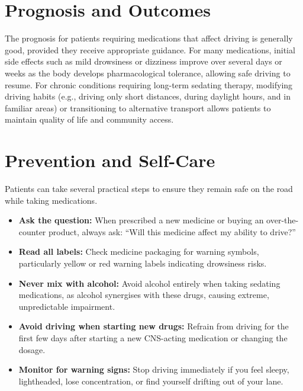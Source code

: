 \section*{Prognosis and Outcomes}
The prognosis for patients requiring medications that affect driving is generally good, provided they receive appropriate guidance. For many medications, initial side effects such as mild drowsiness or dizziness improve over several days or weeks as the body develops pharmacological tolerance, allowing safe driving to resume. For chronic conditions requiring long-term sedating therapy, modifying driving habits (e.g., driving only short distances, during daylight hours, and in familiar areas) or transitioning to alternative transport allows patients to maintain quality of life and community access.

\section*{Prevention and Self-Care}
Patients can take several practical steps to ensure they remain safe on the road while taking medications.
\begin{itemize}
    \item \textbf{Ask the question:} When prescribed a new medicine or buying an over-the-counter product, always ask: ``Will this medicine affect my ability to drive?''
    \item \textbf{Read all labels:} Check medicine packaging for warning symbols, particularly yellow or red warning labels indicating drowsiness risks.
    \item \textbf{Never mix with alcohol:} Avoid alcohol entirely when taking sedating medications, as alcohol synergises with these drugs, causing extreme, unpredictable impairment.
    \item \textbf{Avoid driving when starting new drugs:} Refrain from driving for the first few days after starting a new CNS-acting medication or changing the dosage.
    \item \textbf{Monitor for warning signs:} Stop driving immediately if you feel sleepy, lightheaded, lose concentration, or find yourself drifting out of your lane.
\end{itemize}

